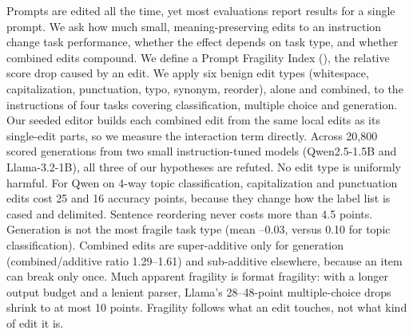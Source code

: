 Prompts are edited all the time, yet most evaluations report results for a single prompt. We ask how much small, meaning-preserving edits to an instruction change task performance, whether the effect depends on task type, and whether combined edits compound. We define a Prompt Fragility Index (\pfi), the relative score drop caused by an edit. We apply six benign edit types (whitespace, capitalization, punctuation, typo, synonym, reorder), alone and combined, to the instructions of four tasks covering classification, multiple choice and generation. Our seeded editor builds each combined edit from the same local edits as its single-edit parts, so we measure the interaction term directly. Across 20,800 scored generations from two small instruction-tuned models (Qwen2.5-1.5B and Llama-3.2-1B), all three of our hypotheses are refuted. No edit type is uniformly harmful. For Qwen on 4-way topic classification, capitalization and punctuation edits cost 25 and 16 accuracy points, because they change how the label list is cased and delimited. Sentence reordering never costs more than 4.5 points. Generation is not the most fragile task type (mean --0.03, versus 0.10 for topic classification). Combined edits are super-additive only for generation (combined/additive ratio 1.29--1.61) and sub-additive elsewhere, because an item can break only once. Much apparent fragility is format fragility: with a longer output budget and a lenient parser, Llama's 28--48-point multiple-choice drops shrink to at most 10 points. Fragility follows what an edit touches, not what kind of edit it is.
